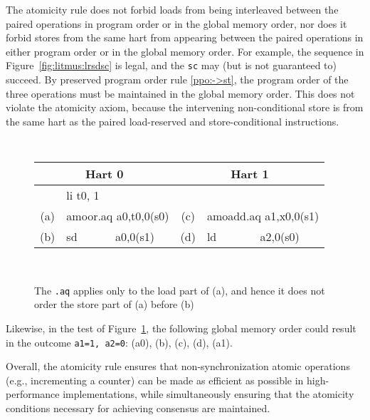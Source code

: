 The atomicity rule does not forbid loads from being interleaved between the paired operations in program order or in the global memory order, nor does it forbid stores from the same hart from appearing between the paired operations in either program order or in the global memory order.
For example, the sequence in Figure~\ref{fig:litmus:lrsdsc} is legal, and the {\tt sc} may (but is not guaranteed to) succeed.
By preserved program order rule \ref{ppo:->st}, the program order of the three operations must be maintained in the global memory order.  This does not violate the atomicity axiom, because the intervening non-conditional store is from the same hart as the paired load-reserved and store-conditional instructions.

\begin{figure}[h!]
  \centering
  {
    \setlength{\tabcolsep}{1mm}
    \tt\footnotesize
    \begin{tabular}{cl||cl}
    \multicolumn{2}{c}{Hart 0} & \multicolumn{2}{c}{Hart 1} \\
    \hline
          & li t0, 1              &     &             \\
      (a) & amoor.aq a0,t0,0(s0)  & (c) & amoadd.aq a1,x0,0(s1) \\
      (b) & sd~~~~~~ a0,0(s1)     & (d) & ld~~~~~~~ a2,0(s0) \\
    \end{tabular}
  }
  ~~
  \diagram
  \caption{The {\tt .aq} applies only to the load part of (a), and hence it does not order the store part of (a) before (b)}
  \label{fig:litmus:amoaq}
\end{figure}

Likewise, in the test of Figure~\ref{fig:litmus:amoaq}, the following global memory order could result in the outcome {\tt a1=1, a2=0}: (a0), (b), (c), (d), (a1).

Overall, the atomicity rule ensures that non-synchronization atomic operations (e.g., incrementing a counter) can be made as efficient as possible in high-performance implementations, while simultaneously ensuring that the atomicity conditions necessary for achieving consensus are maintained.


